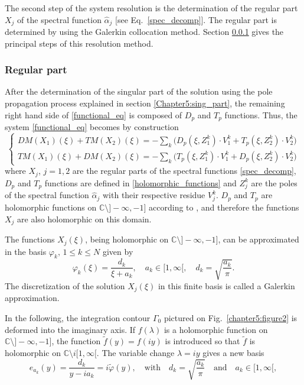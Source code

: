 The second step of the system resolution is the determination of the regular part $X_j$ of the spectral function $\hat{\alpha}_j$ [see Eq.~\eqref{spec_decomp}]. The regular part is determined by using the Galerkin collocation method. Section \ref{Chapter5:regular_part} gives the principal steps of this resolution method. 

\subsubsection{Regular part}
\label{Chapter5:regular_part}

After the determination of the singular part of the solution using the pole propagation process explained in section \ref{Chapter5:sing_part}, the remaining right hand side of \eqref{functional_eq} is composed of $D_p$ and $T_p$ functions. Thus, the system \ref{functional_eq} becomes by construction
\begin{equation}
\label{sys_regular}
\begin{cases}
DM(X_1)(\xi) + TM(X_2)(\xi) = -\underset{k}{\sum} \Big( D_p(\xi,Z_1^k)\cdot V_1^k+ T_p(\xi,Z_2^k)\cdot V_2^k\Big)\\
TM(X_1)(\xi) + DM(X_2)(\xi)  =  -\underset{k}{\sum} \Big( T_p(\xi,Z_1^k)\cdot V_1^k+ D_p(\xi,Z_2^k)\cdot V_2^k\Big)
\end{cases}
\end{equation}
where $X_j$, $j=1,2$ are the regular parts of the spectral functions \eqref{spec_decomp}, $D_p$ and $T_p$ functions are defined in \eqref{holomorphic_functions} and $Z_j^k$ are the poles of the spectral function $\hat{\alpha}_j$  with their respective residue $V_j^k$. $D_p$ and $T_p$ are holomorphic functions on $\mathbb{C}\setminus  ]-\infty,-1]$ according to \cite{CroisilleLebeau}, and therefore the functions $X_j$ are also holomorphic on this domain.

The functions $X_j(\xi)$, being holomorphic on $\mathbb{C}\setminus  ]-\infty,-1]$, can be approximated in the basis $\varphi_k, \, 1 \leq k \leq N$ given by
\begin{equation}
\label{Gal_basis}
\varphi_k(\xi) = \dfrac{d_k}{\xi + a_k}, \quad a_k \in [1,\infty[, \quad d_k=\sqrt{\frac{a_k}{\pi}}.
\end{equation}
The discretization of the solution $X_j(\xi)$ in this finite basis is called a Galerkin approximation.

In the following, the integration contour $\Gamma_0$ pictured on Fig.~\ref{chapter5:figure2} is deformed into the imaginary axis. If $f(\lambda)$ is a holomorphic function on $\mathbb{C}\setminus  ]-\infty,-1]$, the function $\tilde f (y)=f(iy)$ is introduced so that $\tilde f$ is holomorphic on $\mathbb{C}\setminus i [1,\infty[ $. The variable change $\lambda = iy$ gives a new basis
\begin{equation}
\label{Galerkin_basis}
e_{a_k}(y) = \dfrac{d_k}{y-i{a_k}}=i\tilde \varphi(y), \quad \text{with} \quad d_k=\sqrt{\frac{a_k}{\pi}} \quad \text{and} \quad a_k \in [1,\infty[,
\end{equation}

